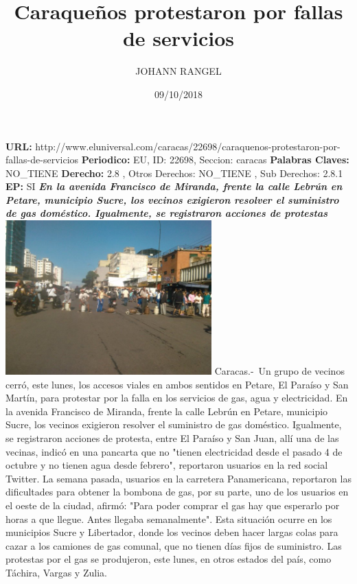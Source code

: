 \documentclass{article}%
\title{\textbf{Caraqueños protestaron por fallas de servicios}}%
\author{JOHANN RANGEL}%
\date{09/10/2018}%
\begin{document}
%
\normalsize%
\maketitle%
\textbf{URL: }%
http://www.eluniversal.com/caracas/22698/caraquenos{-}protestaron{-}por{-}fallas{-}de{-}servicios\newline%
%
\textbf{Periodico: }%
EU, %
ID: %
22698, %
Seccion: %
caracas\newline%
%
\textbf{Palabras Claves: }%
NO\_TIENE\newline%
%
\textbf{Derecho: }%
2.8%
, Otros Derechos: %
NO\_TIENE%
, Sub Derechos: %
2.8.1%
\newline%
%
\textbf{EP: }%
SI\newline%
\newline%
%
\textbf{\textit{En la avenida Francisco de Miranda, frente la calle Lebrún en Petare, municipio Sucre, los vecinos exigieron resolver el suministro de gas doméstico. Igualmente, se registraron acciones de protestas}}%
\newline%
\newline%
%
\includegraphics[width=300px]{235.jpg}%
\newline%
%
Caracas.{-}~Un grupo de vecinos  cerró, este lunes, los accesos viales en ambos sentidos en Petare, El Paraíso y San Martín,  para protestar por la falla en  los servicios de gas,  agua y electricidad.%
\newline%
%
En la avenida  Francisco de Miranda, frente la calle Lebrún en Petare, municipio Sucre, los vecinos exigieron resolver el suministro de gas doméstico. \newline%
Igualmente, se registraron acciones de protesta, entre El Paraíso y San Juan, allí una de las vecinas, indicó en una pancarta que no "tienen electricidad desde el pasado 4 de octubre y no tienen agua desde febrero", reportaron usuarios en la red social Twitter.%
\newline%
%
La semana pasada, usuarios en la carretera  Panamericana, reportaron las dificultades para obtener la bombona de gas, por su parte, uno de los usuarios en el oeste de la ciudad, afirmó: "Para poder comprar el gas hay que esperarlo por horas a que llegue. Antes llegaba semanalmente". \newline%
Esta situación  ocurre en los municipios Sucre y Libertador, donde los vecinos deben hacer largas colas para cazar a los camiones de gas comunal, que no tienen días fijos de suministro.%
\newline%
%
Las protestas por el gas se produjeron, este lunes, en otros estados del país, como Táchira, Vargas y Zulia.%
\newline%
%
\end{document}

